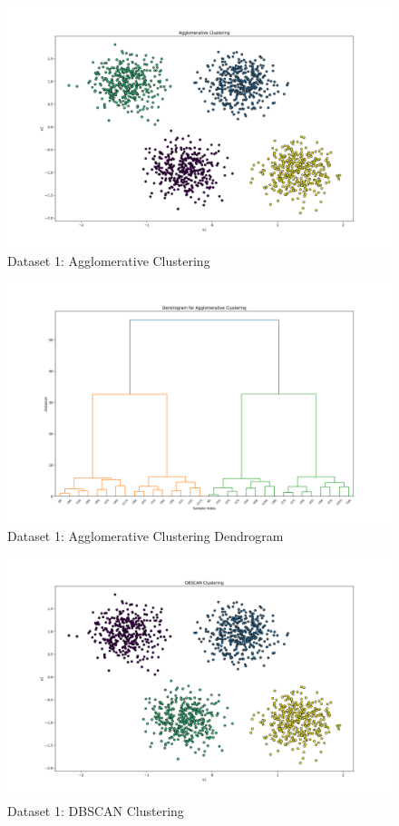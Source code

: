 \begin{figure}[H]
	\centering
	\includegraphics[width=0.9\linewidth]{Images/Clusters-5-v0-Agglomerative Clustering.png}
	\caption{Dataset 1: Agglomerative Clustering}
	\label{fig:clusters-5-v0-agglomerative-clustering}
\end{figure}

\begin{figure}[H]
    \centering
    \includegraphics[width=0.75\linewidth]{Images/Clusters-5-v0-Agglomerative-Dendrogram.png}
    \caption{Dataset 1: Agglomerative Clustering Dendrogram}
    \label{fig:clusters-5-v0-agglomerative-dendrogram}
\end{figure}

\begin{figure}[H]
	\centering
	\includegraphics[width=0.75\linewidth]{Images/Clusters-5-v0-DBSCAN Clustering.png}
	\caption{Dataset 1: DBSCAN Clustering}
	\label{fig:clusters-5-v0-dbscan-clustering}
\end{figure}

